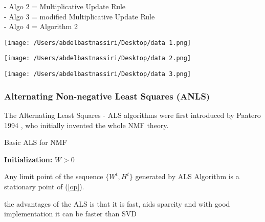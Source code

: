 \documentclass[aspectratio=169]{beamer}
\begin{document}
\begin{spacing}{1.0}
\begin{frame}
        - Algo 2 = Multiplicative Update Rule\\
        - Algo 3 = modified Multiplicative Update Rule\\
        - Algo 4 = Algorithm 2
\end{frame}
\begin{frame}
    \texttt{[image: /Users/abdelbastnassiri/Desktop/data 1.png]}
\end{frame}
\begin{frame}
    \texttt{[image: /Users/abdelbastnassiri/Desktop/data 2.png]}
\end{frame}
\begin{frame}
    \texttt{[image: /Users/abdelbastnassiri/Desktop/data 3.png]}
\end{frame}
\begin{frame}
    \frametitle{Alternating Non-negative Least Squares (ANLS)}
    The Alternating Least Squares - ALS algorithms were first introduced by Paatero 1994 , 
    who initially invented the whole NMF theory.
    \begin{algorithm}[H]
        \caption{Basic ALS for NMF}
        \textbf{Initialization:} $W > 0$\;
    \end{algorithm}
\end{frame}
\begin{frame}
    \begin{theorem}
        Any limit point of the sequence $\{W^{t} , H^{t}\}$ generated by ALS Algorithm  is a stationary point of (\ref{op}).
    \end{theorem}
    the advantages of the ALS is that it is fast, aids sparcity and with good implementation it can be faster 
    than SVD    
\end{frame}
\end{spacing}
\end{document}

